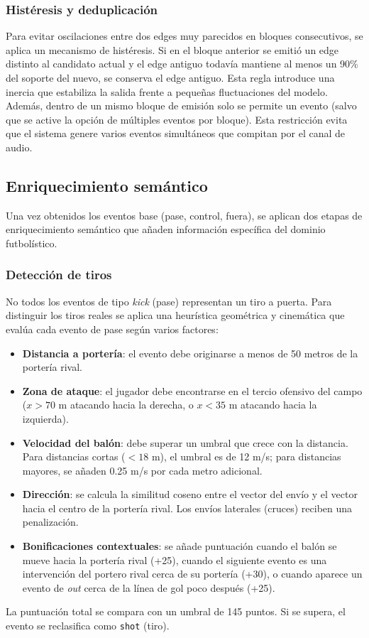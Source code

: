\subsubsection{Histéresis y deduplicación}
Para evitar oscilaciones entre dos edges muy parecidos en bloques consecutivos, se aplica un mecanismo de histéresis. Si en el bloque anterior se emitió un edge distinto al candidato actual y el edge antiguo todavía mantiene al menos un 90\% del soporte del nuevo, se conserva el edge antiguo. Esta regla introduce una inercia que estabiliza la salida frente a pequeñas fluctuaciones del modelo.
Además, dentro de un mismo bloque de emisión solo se permite un evento (salvo que se active la opción de múltiples eventos por bloque). Esta restricción evita que el sistema genere varios eventos simultáneos que compitan por el canal de audio.
\subsection{Enriquecimiento semántico}
Una vez obtenidos los eventos base (pase, control, fuera), se aplican dos etapas de enriquecimiento semántico que añaden información específica del dominio futbolístico.
\subsubsection{Detección de tiros}
No todos los eventos de tipo \textit{kick} (pase) representan un tiro a puerta. Para distinguir los tiros reales se aplica una heurística geométrica y cinemática que evalúa cada evento de pase según varios factores:
\begin{itemize}
    \item \textbf{Distancia a portería}: el evento debe originarse a menos de 50 metros de la portería rival.
    \item \textbf{Zona de ataque}: el jugador debe encontrarse en el tercio ofensivo del campo ($x > 70$ m atacando hacia la derecha, o $x < 35$ m atacando hacia la izquierda).
    \item \textbf{Velocidad del balón}: debe superar un umbral que crece con la distancia. Para distancias cortas ($< 18$ m), el umbral es de 12 m/s; para distancias mayores, se añaden 0.25 m/s por cada metro adicional.
    \item \textbf{Dirección}: se calcula la similitud coseno entre el vector del envío y el vector hacia el centro de la portería rival. Los envíos laterales (cruces) reciben una penalización.
    \item \textbf{Bonificaciones contextuales}: se añade puntuación cuando el balón se mueve hacia la portería rival (+25), cuando el siguiente evento es una intervención del portero rival cerca de su portería (+30), o cuando aparece un evento de \textit{out} cerca de la línea de gol poco después (+25).
\end{itemize}
La puntuación total se compara con un umbral de 145 puntos. Si se supera, el evento se reclasifica como \texttt{shot} (tiro).
